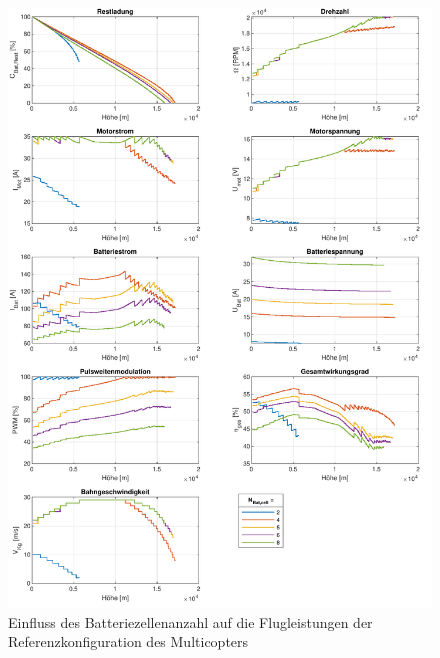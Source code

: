 \begin{figure}[H]
\centering
	\includegraphics[scale=0.70]{Diagramme/Untersuchung_N_Bat.pdf}
	\caption{Einfluss des Batteriezellenanzahl auf die Flugleistungen der Referenzkonfiguration des Multicopters}
	\label{abb:N_Bat_einfluss}
\end{figure}

